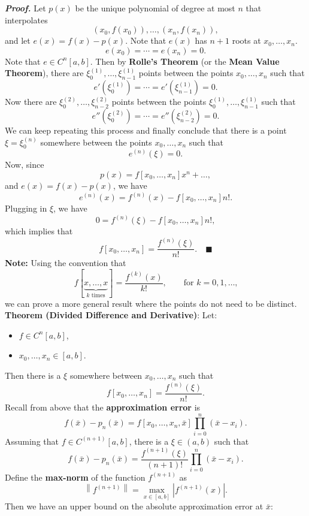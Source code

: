 \documentclass{report}
\begin{document}
\begin{itemize}
    \bigbreak \noindent 
    \textbf{\textit{Proof.}}
    Let $p(x)$ be the unique polynomial of degree at most $n$ that interpolates 
    $$(x_0,f(x_0)),\ldots,(x_n,f(x_n)),$$
    and let $e(x) = f(x) - p(x)$. Note that $e(x)$ has $n+1$ roots at $x_0,\ldots,x_n$. 
    $$e(x_0) = \cdots = e(x_n) = 0.$$
    Note that $e \in C^n[a,b]$.
    \bigbreak \noindent 
    Then by \textbf{Rolle's Theorem} (or the \textbf{Mean Value Theorem}), there are $\xi^{(1)}_0,\ldots,\xi^{(1)}_{n-1}$ points between the points $x_0,\ldots,x_n$ such that
    $$e'(\xi^{(1)}_0) = \cdots = e'(\xi^{(1)}_{n-1}) = 0.$$
    Now there are $\xi^{(2)}_0,\ldots,\xi^{(2)}_{n-2}$ points between the points $\xi^{(1)}_0,\ldots,\xi^{(1)}_{n-1}$ such that
    $$e''(\xi^{(2)}_0) = \cdots = e''(\xi^{(2)}_{n-2}) = 0.$$
    We can keep repeating this process and finally conclude that there is a point $\xi = \xi^{(n)}_0$ somewhere between the points $x_0,\ldots,x_n$ such that
    $$e^{(n)}(\xi) = 0.$$
    \bigbreak \noindent 
    Now, since
    $$p(x) = f[x_0,\ldots,x_n]x^n + \ldots,$$
    and $e(x) = f(x) - p(x)$, we have
    $$e^{(n)}(x) = f^{(n)}(x) - f[x_0,\ldots,x_n] n!.$$
    Plugging in $\xi$, we have
    $$0 = f^{(n)}(\xi) - f[x_0,\ldots,x_n] n!,$$
    which implies that
    $$f[x_0,\ldots,x_n] = \frac{f^{(n)}(\xi)}{n!}. \quad \blacksquare$$
    \bigbreak \noindent 
    \textbf{Note:} 
    Using the convention that
    $$
    f[\underbrace{x,\ldots,x}_{\text{$k$ times}}] = \frac{f^{(k)}(x)}{k!}, \qquad \text{for $k=0,1,\ldots$,}
    $$
    we can prove a more general result where the points do not need to be distinct.
    \bigbreak \noindent 
    \textbf{Theorem (Divided Difference and Derivative)}: 
    Let:
    \begin{itemize}
        \item $f \in C^n[a,b]$,
        \item $x_0,\ldots,x_n \in [a,b]$. 
    \end{itemize}
    Then there is a $\xi$ somewhere between $x_0,\ldots,x_n$ such that
    $$ f[x_0,\ldots,x_n] = \frac{f^{(n)}(\xi)}{n!}. $$
    \bigbreak \noindent 
    Recall from above that the \textbf{approximation error} is 
    $$f(\bar x) - p_n(\bar x) = f[x_0,\ldots,x_n,\bar x] \prod_{i=0}^n (\bar x-x_i).$$
    Assuming that $f \in C^{(n+1)}[a,b]$, there is a $\xi \in (a,b)$ such that
    $$f(\bar x) - p_n(\bar x) = \frac{f^{(n+1)}(\xi)}{(n+1)!} \prod_{i=0}^n (\bar x-x_i).$$
    Define the \textbf{max-norm} of the function $f^{(n+1)}$ as
    $$\left\|f^{(n+1)}\right\| = \max_{x \in [a,b]} \left|f^{(n+1)}(x)\right|.$$ 
    Then we have an upper bound on the absolute approximation error at $\bar x$:

\end{itemize}
\end{document}
